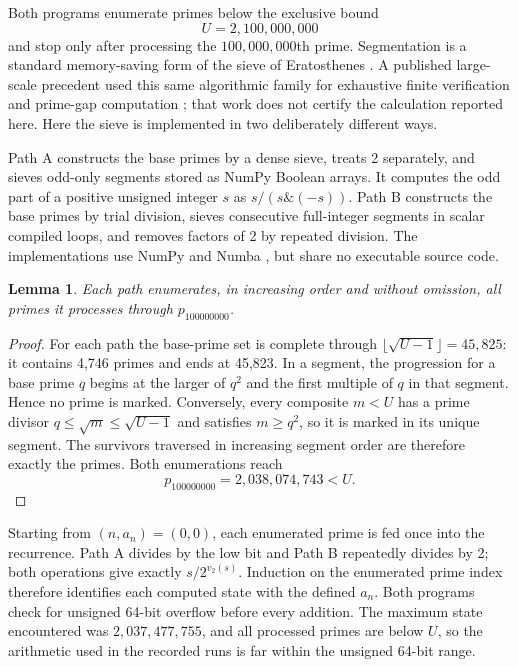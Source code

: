 \documentclass[11pt]{article}
\newtheorem{lemma}[theorem]{Lemma}
\begin{document}
Both programs enumerate primes below the exclusive bound
\[
U=2{,}100{,}000{,}000
\]
and stop only after processing the $100{,}000{,}000$th prime.  Segmentation is
a standard memory-saving form of the sieve of Eratosthenes
\cite{baysHudson1977}.  A published large-scale precedent used this same
algorithmic family for exhaustive finite verification and prime-gap
computation \cite{oliveiraSilvaHerzogPardi2014}; that work does not certify the
calculation reported here.  Here the sieve is implemented in two deliberately
different ways.

Path A constructs the base primes by a dense sieve, treats 2 separately, and
sieves odd-only segments stored as NumPy Boolean arrays.  It computes the
odd part of a positive unsigned integer $s$ as $s/(s\mathbin{\&}(-s))$.
Path B constructs the base primes by trial division, sieves consecutive
full-integer segments in scalar compiled loops, and removes factors of 2 by
repeated division.  The implementations use NumPy and Numba
\cite{harris2020numpy,lam2015numba}, but share no executable source code.

\begin{lemma}\label{lem:sieve}
Each path enumerates, in increasing order and without omission, all primes it
processes through $p_{100000000}$.
\end{lemma}

\begin{proof}
For each path the base-prime set is complete through
$\lfloor\sqrt{U-1}\rfloor=45{,}825$: it contains 4,746 primes and ends at
45,823.  In a segment, the progression for a base prime $q$ begins at the
larger of $q^2$ and the first multiple of $q$ in that segment.  Hence no prime
is marked.  Conversely, every composite $m<U$ has a prime divisor
$q\le\sqrt m\le\sqrt{U-1}$ and satisfies $m\ge q^2$, so it is marked in its
unique segment.  The survivors traversed in increasing segment order are
therefore exactly the primes.  Both enumerations reach
\[
 p_{100000000}=2{,}038{,}074{,}743<U.
\]
\end{proof}

Starting from $(n,a_n)=(0,0)$, each enumerated prime is fed once into the
recurrence.  Path A divides by the low bit and Path B repeatedly divides by
2; both operations give exactly $s/2^{v_2(s)}$.  Induction on the enumerated
prime index therefore identifies each computed state with the defined
$a_n$.  Both programs check for unsigned 64-bit overflow before every
addition.  The maximum state encountered was $2{,}037{,}477{,}755$, and all
processed primes are below $U$, so the arithmetic used in the recorded runs
is far within the unsigned 64-bit range.
\end{document}

